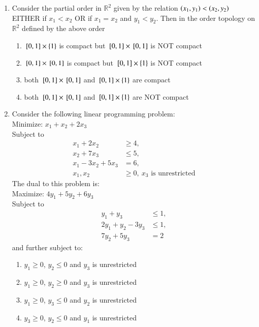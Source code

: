 \documentclass[journal]{IEEEtran}
\begin{document}
\begin{enumerate}
\item Consider the partial order in $\mathbb{R}^2$ given by the relation $\left(x_1, y_1\right) < \left(x_2, y_2\right)$ EITHER if $x_1 < x_2$ OR if $x_1 = x_2$ and $y_1 < y_2$. Then in the order topology on $\mathbb{R}^2$ defined by the above order
\begin{enumerate}
    \item ${}\left[0, 1\right] \times \{1\}$ is compact but ${}\left[0, 1\right] \times {}\left[0, 1\right]$ is NOT compact
    \item ${}\left[0, 1\right] \times {}\left[0, 1\right]$ is compact but ${}\left[0, 1\right] \times \{1\}$ is NOT compact
    \item both ${}\left[0, 1\right] \times {}\left[0, 1\right]$ and ${}\left[0, 1\right] \times \{1\}$ are compact
    \item both ${}\left[0, 1\right] \times {}\left[0, 1\right]$ and ${}\left[0, 1\right] \times \{1\}$ are NOT compact \\
\end{enumerate}
\item Consider the following linear programming problem: \\
Minimize: $x_1 + x_2 + 2x_3$ \\
Subject to
\begin{align*}
    x_1 + 2x_2 & \geq 4, \\
    x_2 + 7x_3 & \leq 5, \\
    x_1 - 3x_2 + 5x_3 & = 6, \\
    x_1, x_2 & \geq 0,\ x_3 \text{ is unrestricted}
\end{align*}
The dual to this problem is: \\
Maximize: $4y_1 + 5y_2 + 6y_3$ \\
Subject to
\begin{align*}
    y_1 + y_3 & \leq 1, \\
    2y_1 + y_2 - 3y_3 & \leq 1, \\
    7y_2 + 5y_3 & = 2
\end{align*}
and further subject to:
  \begin{enumerate}
   \item $y_1 \geq 0$, $y_2 \leq 0$ and $y_3$ is unrestricted
   \item $y_1 \geq 0$, $y_2 \geq 0$ and $y_3$ is unrestricted
   \item $y_1 \geq 0$, $y_3 \leq 0$ and $y_2$ is unrestricted
   \item $y_3 \geq 0$, $y_2 \leq 0$ and $y_1$ is unrestricted \\
\end{enumerate}

\end{enumerate}
\end{document}
